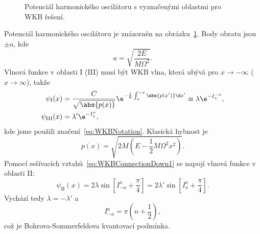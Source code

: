 \begin{solution}
	\begin{figure}[!htbp]
	\centering
	\caption{
		Potenciál harmonického oscilátoru s vyznačenými oblastmi pro WKB řešení.
	}
	\label{fig:WKBHarmonicOscillator}
	\end{figure}	
		
	Potenciál harmonického oscilátoru je znázorněn na obrázku~\ref{fig:WKBHarmonicOscillator}.
	Body obratu jsou $\pm a$, kde
	\begin{equation}
		a=\sqrt{\frac{2E}{M\Omega^{2}}}.
	\end{equation}
	Vlnová funkce v oblasti I (III) musí být WKB vlna, která ubývá pro $x\rightarrow-\infty$ ($x\rightarrow\infty$), takže
	\begin{subequations}
		\begin{align}
			\psi_{\mathrm{I}}(x)&=\frac{C}{\sqrt{\abs{p(x)}}}\e^{-\frac{1}{\hbar}\int_{x}^{-a}\abs{p(x')}\d x'}\equiv\lambda\e^{-I_{x}^{-a}},\\
			\psi_{\mathrm{III}}(x)&=\lambda'\e^{-I_{a}^{x}},
		\end{align}				
	\end{subequations}
	kde jsme použili značení~\eqref{eq:WKBNotation}.
	Klasická hybnost je
	\begin{equation}
		p(x)=\sqrt{2M\left(E-\frac{1}{2}M\Omega^{2}x^{2}\right)}.
	\end{equation}	
	Pomocí sešívacích vztahů~\eqref{eq:WKBConnectionDown1} se napojí vlnová funkce v oblasti II:
	\begin{equation}
		\psi_{\mathrm{II}}(x)=2\lambda\sin{\left[I_{-a}^{x}+\frac{\pi}{4}\right]}=2\lambda'\sin{\left[I_{x}^{a}+\frac{\pi}{4}\right]}.
	\end{equation}
	Vychází tedy $\lambda=-\lambda'$ a
	\begin{equation}
		\label{eq:WKBHarmonicOscillatorBS}
		I_{-a}^{a}=\pi\left(n+\frac{1}{2}\right),
	\end{equation}
	což je Bohrova-Sommerfeldova kvantovací podmínka.
	

\end{solution}
